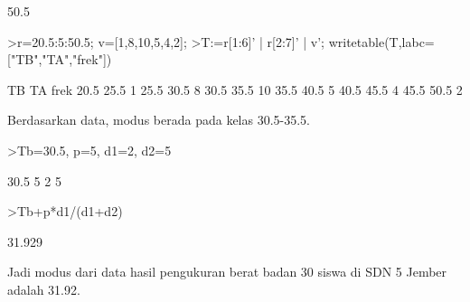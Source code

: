 \documentclass[12pt,arial,letterpaper]{book}
\begin{document}
\begin{eulercomment}
\begin{eulercomment}
\begin{eulercomment}
\begin{eulercomment}
\begin{eulercomment}
\begin{eulercomment}
\begin{eulercomment}
\begin{eulercomment}
\begin{eulercomment}
\begin{eulercomment}
\begin{eulercomment}
\begin{eulercomment}
\begin{eulercomment}
\begin{eulercomment}
\begin{eulercomment}
\begin{eulercomment}
\begin{eulercomment}
\begin{eulercomment}
\begin{eulercomment}
\begin{eulercomment}
\begin{eulercomment}
\begin{eulercomment}
\begin{eulercomment}
\begin{eulercomment}
\begin{eulercomment}
\begin{eulercomment}
\begin{eulercomment}
\begin{eulercomment}
\begin{eulercomment}
\begin{eulercomment}
\begin{eulercomment}
\begin{eulercomment}
\begin{eulercomment}
\begin{eulercomment}
\begin{eulercomment}
\begin{eulercomment}
\begin{eulercomment}
\begin{eulercomment}
\begin{euleroutput}
  50.5
\end{euleroutput}
\begin{eulerprompt}
>r=20.5:5:50.5; v=[1,8,10,5,4,2];
>T:=r[1:6]' | r[2:7]' | v'; writetable(T,labc=["TB","TA","frek"])
\end{eulerprompt}
\begin{euleroutput}
          TB        TA      frek
        20.5      25.5         1
        25.5      30.5         8
        30.5      35.5        10
        35.5      40.5         5
        40.5      45.5         4
        45.5      50.5         2
\end{euleroutput}
\begin{eulercomment}
Berdasarkan data, modus berada pada kelas 30.5-35.5.
\end{eulercomment}
\begin{eulerprompt}
>Tb=30.5, p=5, d1=2, d2=5
\end{eulerprompt}
\begin{euleroutput}
  30.5
  5
  2
  5
\end{euleroutput}
\begin{eulerprompt}
>Tb+p*d1/(d1+d2)
\end{eulerprompt}
\begin{euleroutput}
  31.929
\end{euleroutput}
\begin{eulercomment}
Jadi modus dari data hasil pengukuran berat badan 30 siswa di SDN 5
Jember adalah 31.92.


\end{eulercomment}
\end{eulercomment}
\end{eulercomment}
\end{eulercomment}
\end{eulercomment}
\end{eulercomment}
\end{eulercomment}
\end{eulercomment}
\end{eulercomment}
\end{eulercomment}
\end{eulercomment}
\end{eulercomment}
\end{eulercomment}
\end{eulercomment}
\end{eulercomment}
\end{eulercomment}
\end{eulercomment}
\end{eulercomment}
\end{eulercomment}
\end{eulercomment}
\end{eulercomment}
\end{eulercomment}
\end{eulercomment}
\end{eulercomment}
\end{eulercomment}
\end{eulercomment}
\end{eulercomment}
\end{eulercomment}
\end{eulercomment}
\end{eulercomment}
\end{eulercomment}
\end{eulercomment}
\end{eulercomment}
\end{eulercomment}
\end{eulercomment}
\end{eulercomment}
\end{eulercomment}
\end{eulercomment}
\end{eulercomment}
\end{document}
